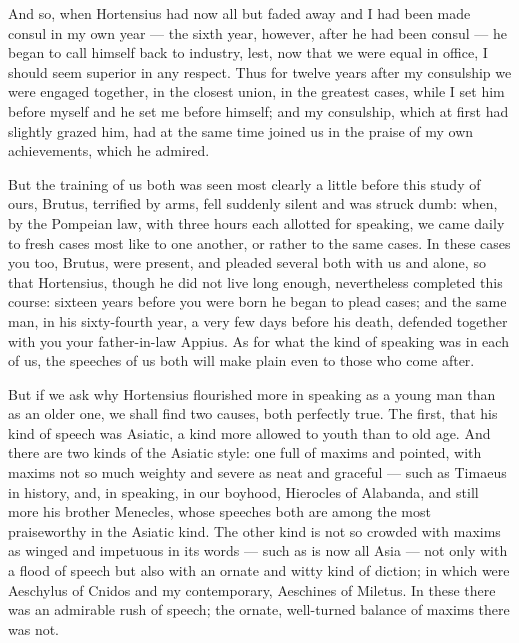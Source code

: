  And so, when Hortensius had now all but faded away and I had been made consul in my own year — the sixth year, however, after he had been consul — he began to call himself back to industry, lest, now that we were equal in office, I should seem superior in any respect. Thus for twelve years after my consulship we were engaged together, in the closest union, in the greatest cases, while I set him before myself and he set me before himself; and my consulship, which at first had slightly grazed him, had at the same time joined us in the praise of my own achievements, which he admired.

 But the training of us both was seen most clearly a little before this study of ours, Brutus, terrified by arms, fell suddenly silent and was struck dumb: when, by the Pompeian law, with three hours each allotted for speaking, we came daily to fresh cases most like to one another, or rather to the same cases. In these cases you too, Brutus, were present, and pleaded several both with us and alone, so that Hortensius, though he did not live long enough, nevertheless completed this course: sixteen years before you were born he began to plead cases; and the same man, in his sixty-fourth year, a very few days before his death, defended together with you your father-in-law Appius. As for what the kind of speaking was in each of us, the speeches of us both will make plain even to those who come after.

 But if we ask why Hortensius flourished more in speaking as a young man than as an older one, we shall find two causes, both perfectly true. The first, that his kind of speech was Asiatic, a kind more allowed to youth than to old age. And there are two kinds of the Asiatic style: one full of maxims and pointed, with maxims not so much weighty and severe as neat and graceful — such as Timaeus in history, and, in speaking, in our boyhood, Hierocles of Alabanda, and still more his brother Menecles, whose speeches both are among the most praiseworthy in the Asiatic kind. The other kind is not so crowded with maxims as winged and impetuous in its words — such as is now all Asia — not only with a flood of speech but also with an ornate and witty kind of diction; in which were Aeschylus of Cnidos and my contemporary, Aeschines of Miletus. In these there was an admirable rush of speech; the ornate, well-turned balance of maxims there was not.

